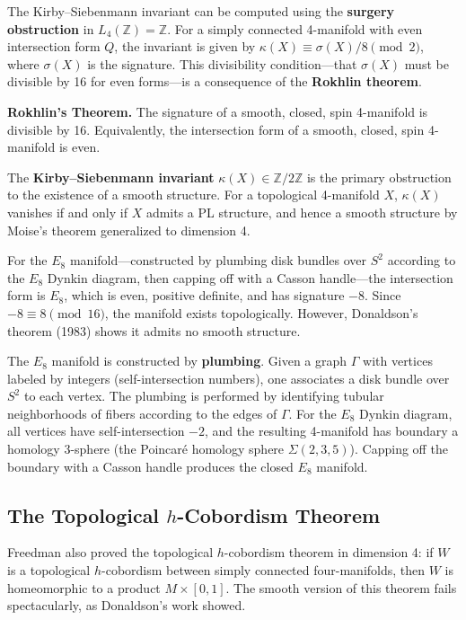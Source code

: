 The Kirby--Siebenmann invariant can be computed using the \textbf{surgery obstruction} in $L_4(\mathbb{Z}) = \mathbb{Z}$. For a simply connected 4-manifold with even intersection form $Q$, the invariant is given by $\kappa(X) \equiv \sigma(X)/8 \pmod{2}$, where $\sigma(X)$ is the signature. This divisibility condition---that $\sigma(X)$ must be divisible by 16 for even forms---is a consequence of the \textbf{Rokhlin theorem}.

\textbf{Rokhlin's Theorem.} The signature of a smooth, closed, spin 4-manifold is divisible by 16. Equivalently, the intersection form of a smooth, closed, spin 4-manifold is even.

The \textbf{Kirby--Siebenmann invariant} $\kappa(X) \in \mathbb{Z}/2\mathbb{Z}$ is the primary obstruction to the existence of a smooth structure. For a topological 4-manifold $X$, $\kappa(X)$ vanishes if and only if $X$ admits a PL structure, and hence a smooth structure by Moise's theorem generalized to dimension 4.

For the $E_8$ manifold---constructed by plumbing disk bundles over $S^2$ according to the $E_8$ Dynkin diagram, then capping off with a Casson handle---the intersection form is $E_8$, which is even, positive definite, and has signature $-8$. Since $-8 \equiv 8 \pmod{16}$, the manifold exists topologically. However, Donaldson's theorem (1983) shows it admits no smooth structure.

The $E_8$ manifold is constructed by \textbf{plumbing}. Given a graph $\Gamma$ with vertices labeled by integers (self-intersection numbers), one associates a disk bundle over $S^2$ to each vertex. The plumbing is performed by identifying tubular neighborhoods of fibers according to the edges of $\Gamma$. For the $E_8$ Dynkin diagram, all vertices have self-intersection $-2$, and the resulting 4-manifold has boundary a homology 3-sphere (the Poincaré homology sphere $\Sigma(2,3,5)$). Capping off the boundary with a Casson handle produces the closed $E_8$ manifold.

\subsection*{The Topological $h$-Cobordism Theorem}

Freedman also proved the topological $h$-cobordism theorem in dimension 4: if $W$ is a topological $h$-cobordism between simply connected four-manifolds, then $W$ is homeomorphic to a product $M \times [0,1]$. The smooth version of this theorem fails spectacularly, as Donaldson's work showed.

